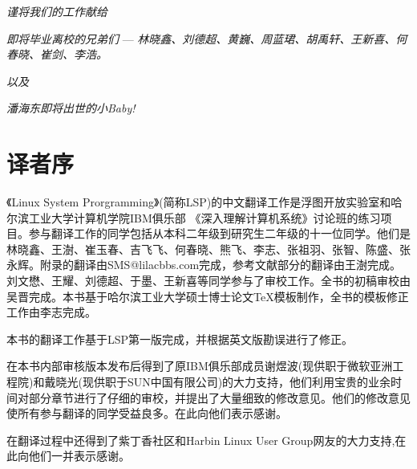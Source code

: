 \vspace*{16ex}
\begin{center}
	\textit{\huge 谨将我们的工作献给} 
\end{center}

\begin{center}
	\textit{\Large 即将毕业离校的兄弟们} --- \textit{\Large 林晓鑫、刘德超、黄巍、周蓝珺、胡禹轩、王新喜、何春晓、崔剑、李浩。}
\end{center}

\begin{center}
	\textit{\large 以及}
\end{center}

\begin{center}
	\textit{\Large 潘海东即将出世的小Baby!}
\end{center}

\newpage
\chapter{译者序}
《Linux System Prorgramming》(简称LSP)的中文翻译工作是浮图开放实验室和哈尔滨工业大学计算机学院IBM俱乐部 《深入理解计算机系统》讨论班的练习项目。参与翻译工作的同学包括从本科二年级到研究生二年级的十一位同学。他们是林晓鑫、王澍、崔玉春、吉飞飞、何春晓、熊飞、李志、张祖羽、张智、陈盛、张永辉。附录的翻译由SMS@lilacbbs.com完成，参考文献部分的翻译由王澍完成。刘文懋、王耀、刘德超、于墨、王新喜等同学参与了审校工作。全书的初稿审校由吴晋完成。本书基于哈尔滨工业大学硕士博士论文TeX模板制作，全书的模板修正工作由李志完成。

本书的翻译工作基于LSP第一版完成，并根据英文版勘误进行了修正。

在本书内部审核版本发布后得到了原IBM俱乐部成员谢煜波(现供职于微软亚洲工程院)和戴晓光(现供职于SUN中国有限公司)的大力支持，他们利用宝贵的业余时间对部分章节进行了仔细的审校，并提出了大量细致的修改意见。他们的修改意见使所有参与翻译的同学受益良多。在此向他们表示感谢。

在翻译过程中还得到了紫丁香社区和Harbin Linux User Group网友的大力支持,在此向他们一并表示感谢。

